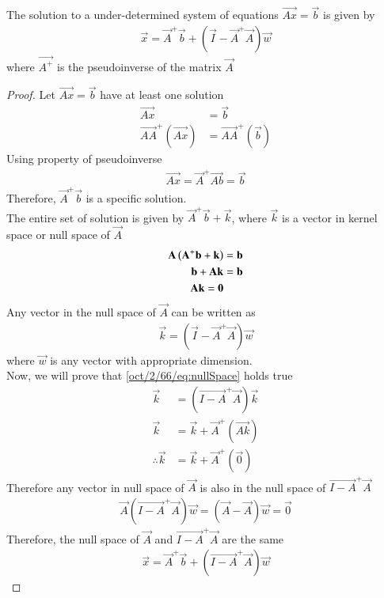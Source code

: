 
\begin{theorem}
The solution to a under-determined system of equations $\vec{Ax}=\vec{b}$ is given by
\begin{align}
    \vec{x}=\vec{A}^+\vec{b}+(\vec{I}-\vec{A}^+\vec{A})\vec{w} \label{oct/2/66/eq:generalisedInverse}
\end{align}
where $\vec{A^+}$ is the pseudoinverse of the matrix $\vec{A}$\\
\end{theorem}

\begin{proof}
Let $\vec{Ax}=\vec{b}$ have at least one solution
\begin{align}
    \vec{Ax}&=\vec{b}\\
    \vec{AA}^+(\vec{Ax})&=\vec{AA}^+(\vec{b})
\end{align}
Using property of pseudoinverse
\begin{align}
    \vec{Ax}=\vec{A}^+\vec{Ab}=\vec{b}
\end{align}
Therefore, $\vec{A}^+\vec{b}$ is a specific solution.\\
The entire set of solution is given by $\vec{A}^+\vec{b}+\vec{k}$, where $\vec{k}$ is a vector in kernel space or null space of $\vec{A}$
\begin{align}
    \mathbf{A}\left(\mathbf{A}^+\mathbf{b}+\mathbf{k}\right)&=\mathbf{b}\\
    \mathbf{b}+\mathbf{Ak}&=\mathbf{b}\\
    \mathbf{Ak}=\mathbf{0}
\end{align}
Any vector in the null space of $\vec{A}$ can be written as
\begin{align}
    \vec{k}=(\vec{I}-\vec{A}^+\vec{A})\vec{w} \label{oct/2/66/eq:nullSpace}
\end{align}
where $\vec{w}$ is any vector with appropriate dimension.\\
Now, we will prove that \eqref{oct/2/66/eq:nullSpace} holds true
\begin{align}
    \vec{k}&=(\vec{I-A}^+\vec{A})\vec{k}\\
    \vec{k}&=\vec{k}+\vec{A}^+(\vec{Ak})\\
    \therefore \vec{k}&=\vec{k}+\vec{A}^+(\vec{0})
\end{align}
Therefore any vector in null space of $\vec{A}$ is also in the null space of $ \vec{I-A}^+\vec{A} $
\begin{align}
    \vec{A}(\vec{I-A}^+\vec{A})\vec{w}=(\vec{A}-\vec{A})\vec{w}=\vec{0}
\end{align}
Therefore, the null space of $\vec{A}$ and $\vec{I-A}^+\vec{A}$ are the same
\begin{align}
    \vec{x}=\vec{A}^+\vec{b}+(\vec{I-A}^+\vec{A})\vec{w}
\end{align}
\end{proof}
